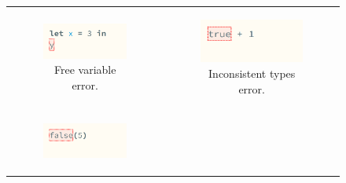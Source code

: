 \begin{figure}[htbp]
  \begin{tabular}[b]{cc}
    \begin{subfigure}[b]{0.3\columnwidth}
      \includegraphics[width=\columnwidth]{images/haz3l-unbound-variable.png}
      \caption{Free variable error.}
      \label{fig:calculus-examples-Free}
    \end{subfigure}
    &
    \begin{subfigure}[b]{0.3\columnwidth}
      \includegraphics[width=\columnwidth]{images/haz3l-inconsistent-types.png}
      \caption{Inconsistent types error.}
      \label{fig:calculus-examples-inconsistent-types}
    \end{subfigure} \\
    \begin{subfigure}[b]{0.3\columnwidth}
      \includegraphics[width=\columnwidth]{images/haz3l-ap-non-matched.png}

\end{subfigure}
\end{tabular}
\end{figure}
